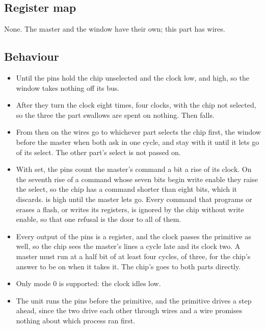 \subsection*{Register map}

None. The master and the window have their own; this part has wires.


\subsection*{Behaviour}

\begin{itemize}
\item Until  the pins hold the chip unselected and the clock
low, and  high, so the window takes nothing off its bus.
\item After  they turn the clock eight times, four clocks, with
the chip not selected, so the three the part swallows are spent on
nothing. Then  falls.
\item From then on the wires go to whichever part selects the chip
first, the window before the master when both ask in one cycle, and
stay with it until it lets go of its select. The other part's select
is not passed on.
\item With  set, the pins count the master's command a bit
a rise of its clock. On the seventh rise of a command whose seven bits
begin write enable they raise the select, so the chip has a command
shorter than eight bits, which it discards.  is high
until the master lets go. Every command that programs or erases a
flash, or writes its registers, is ignored by the chip without write
enable, so that one refusal is the door to all of them.
\item Every output of the pins is a register, and the clock passes the
primitive as well, so the chip sees the master's lines a cycle late
and its clock two. A master must run at a half bit of at least four
cycles,  of three, for the chip's answer to be on 
when it takes it. The chip's  goes to both parts directly.
\item Only mode 0 is supported: the clock idles low.
\item The unit runs the pins before the primitive, and the primitive
drives  a step ahead, since the two drive each other through
wires and a wire promises nothing about which process ran first.
\end{itemize}

